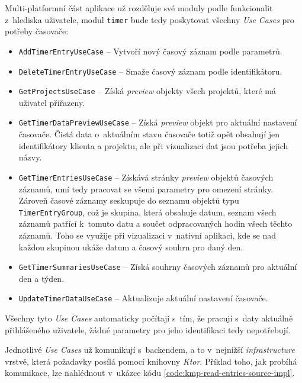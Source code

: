 Multi-platformní část aplikace už rozděluje své moduly podle funkcionalit z~hlediska uživatele, modul \texttt{timer} bude tedy poskytovat všechny \emph{Use Cases} pro potřeby časovače:
\begin{itemize}
\item\texttt{AddTimerEntryUseCase} – Vytvoří nový časový záznam podle parametrů.
\item\texttt{DeleteTimerEntryUseCase} – Smaže časový záznam podle identifikátoru.
\item\texttt{GetProjectsUseCase} – Získá \emph{preview} objekty všech projektů, které má uživatel přiřazeny.
\item\texttt{GetTimerDataPreviewUseCase} – Získá \emph{preview} objekt pro aktuální nastavení časovače. Čistá data o~aktuálním stavu časovače totiž opět obsahují jen identifikátory klienta a projektu, ale při vizualizaci dat jsou potřeba jejich názvy.
\item\texttt{GetTimerEntriesUseCase} – Získává stránky \emph{preview} objektů časových záznamů, umí tedy pracovat se všemi parametry pro omezení stránky. Zároveň časové záznamy seskupuje do seznamu objektů typu \texttt{TimerEntryGroup}, což je skupina, která obsahuje datum, seznam všech záznamů patřící k~tomuto datu a součet odpracovaných hodin všech těchto záznamů. Toho se využije při vizualizaci v~nativní aplikaci, kde se nad každou skupinou ukáže datum a časový souhrn pro daný den.
\item\texttt{GetTimerSummariesUseCase} – Získá souhrny časových záznamů pro aktuální den a týden.
\item\texttt{UpdateTimerDataUseCase} – Aktualizuje aktuální nastavení časovače.
\end{itemize}

Všechny tyto \emph{Use Cases} automaticky počítají s~tím, že pracují s~daty aktuálně přihlášeného uživatele, žádné parametry pro jeho identifikaci tedy nepotřebují.

Jednotlivé \emph{Use Cases} už komunikují s~backendem, a to v~nejnižší \emph{infrastructure} vrstvě, která požadavky posílá pomocí knihovny \emph{Ktor}. Příklad toho, jak probíhá komunikace, lze nahlédnout v~ukázce kódu \ref{code:kmp-read-entries-source-impl}.

